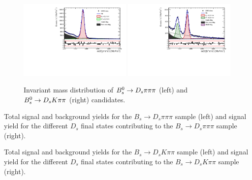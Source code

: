 \begin{figure}[h]
\centering
\includegraphics[height=!,width=0.49\textwidth]{figs/MassFit/norm_pull.pdf}
\includegraphics[height=!,width=0.49\textwidth]{figs/MassFit/signal_pull.pdf}
\caption{Invariant mass distribution of ${{B}^0_{s}}\rightarrow{\ensuremath{{D}_{s}}}{\ensuremath{\pi}}{\ensuremath{\pi}}{\ensuremath{\pi}}$ (left) and  ${{B}^0_{s}}\rightarrow{\ensuremath{{D}_{s}}}{\ensuremath{K}}{\ensuremath{\pi}}{\ensuremath{\pi}}$ (right) candidates.}
\label{fig:massFit}
\end{figure}


\begin{table}[h]
\centering
\caption{Total signal and background yields for the $B_s \to D_s \pi \pi \pi$ sample (left) and
signal yield for the different $D_s$ final states contributing to the $B_s \to D_s \pi \pi \pi$ sample (right).}
 \hfill

\label{tab:massFitNorm}
\end{table}
\begin{table}[h]
\centering
\caption{Total signal and background yields for the $B_s \to D_s K \pi \pi$ sample (left) and
signal yield for the different $D_s$ final states contributing to the $B_s \to D_s  K \pi \pi$ sample (right).}
 \hfill

\label{tab:massFitSig}
\end{table}


